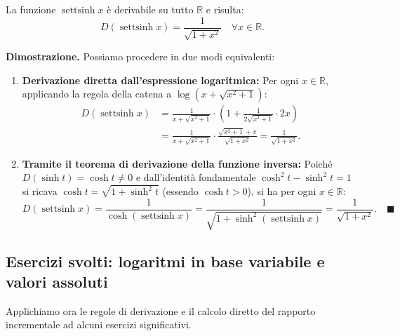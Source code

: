\begin{propbox}
La funzione $\operatorname{settsinh} x$ è derivabile su tutto $\mathbb{R}$ e risulta:
\[
    D(\operatorname{settsinh} x) = \frac{1}{\sqrt{1 + x^2}} \quad \forall x \in \mathbb{R}.
\]
\end{propbox}

\noindent\textbf{Dimostrazione.} Possiamo procedere in due modi equivalenti:
\begin{enumerate}
    \item \textbf{Derivazione diretta dall'espressione logaritmica:} Per ogni $x \in \mathbb{R}$, applicando la regola della catena a $\log\!\left(x + \sqrt{x^2 + 1}\right)$:
    \begin{align*}
        D(\operatorname{settsinh} x) &= \frac{1}{x + \sqrt{x^2 + 1}} \cdot \left(1 + \frac{1}{2\sqrt{x^2 + 1}} \cdot 2x\right) \\
        &= \frac{1}{x + \sqrt{x^2 + 1}} \cdot \frac{\sqrt{x^2 + 1} + x}{\sqrt{1 + x^2}} = \frac{1}{\sqrt{1 + x^2}}.
    \end{align*}

    \item \textbf{Tramite il teorema di derivazione della funzione inversa:} Poiché $D(\sinh t) = \cosh t \neq 0$ e dall'identità fondamentale $\cosh^2 t - \sinh^2 t = 1$ si ricava $\cosh t = \sqrt{1 + \sinh^2 t}$ (essendo $\cosh t > 0$), si ha per ogni $x \in \mathbb{R}$:
    \[
        D(\operatorname{settsinh} x) = \frac{1}{\cosh(\operatorname{settsinh} x)} = \frac{1}{\sqrt{1 + \sinh^2(\operatorname{settsinh} x)}} = \frac{1}{\sqrt{1 + x^2}}. \quad \blacksquare
    \]
\end{enumerate}

\subsection{Esercizi svolti: logaritmi in base variabile e valori assoluti}

Applichiamo ora le regole di derivazione e il calcolo diretto del rapporto incrementale ad alcuni esercizi significativi.


